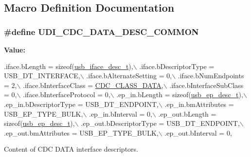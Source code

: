 \subsection{Macro Definition Documentation}
\hypertarget{group__udi__cdc__group__desc_ga8633fe8f07308643879792e822393621}{
\subsubsection[{U\-D\-I\-\_\-\-C\-D\-C\-\_\-\-D\-A\-T\-A\-\_\-\-D\-E\-S\-C\-\_\-\-C\-O\-M\-M\-O\-N}]{\setlength{\rightskip}{0pt plus 5cm}\#define U\-D\-I\-\_\-\-C\-D\-C\-\_\-\-D\-A\-T\-A\-\_\-\-D\-E\-S\-C\-\_\-\-C\-O\-M\-M\-O\-N}}\label{group__udi__cdc__group__desc_ga8633fe8f07308643879792e822393621}
{\bfseries Value\-:}
\begin{DoxyCode}
.iface.bLength                = \textcolor{keyword}{sizeof}(\hyperlink{structusb__iface__desc__t}{usb\_iface\_desc\_t}),\(\backslash\)
   .iface.bDescriptorType        = USB\_DT\_INTERFACE,\(\backslash\)
   .iface.bAlternateSetting      = 0,\(\backslash\)
   .iface.bNumEndpoints          = 2,\(\backslash\)
   .iface.bInterfaceClass        = \hyperlink{group__cdc__protocol__group_ga799bb47bad1d048e420886c575835eb4}{CDC\_CLASS\_DATA},\(\backslash\)
   .iface.bInterfaceSubClass     = 0,\(\backslash\)
   .iface.bInterfaceProtocol     = 0,\(\backslash\)
   .ep\_in.bLength                = \textcolor{keyword}{sizeof}(\hyperlink{structusb__ep__desc__t}{usb\_ep\_desc\_t}),\(\backslash\)
   .ep\_in.bDescriptorType        = USB\_DT\_ENDPOINT,\(\backslash\)
   .ep\_in.bmAttributes           = USB\_EP\_TYPE\_BULK,\(\backslash\)
   .ep\_in.bInterval              = 0,\(\backslash\)
   .ep\_out.bLength               = \textcolor{keyword}{sizeof}(\hyperlink{structusb__ep__desc__t}{usb\_ep\_desc\_t}),\(\backslash\)
   .ep\_out.bDescriptorType       = USB\_DT\_ENDPOINT,\(\backslash\)
   .ep\_out.bmAttributes          = USB\_EP\_TYPE\_BULK,\(\backslash\)
   .ep\_out.bInterval             = 0,
\end{DoxyCode}


Content of C\-D\-C D\-A\-T\-A interface descriptors. 

